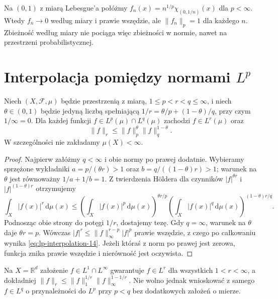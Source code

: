 \begin{przyklad}
Na $(0,1)$ z miarą Lebesgue'a połóżmy
$f_n(x)=n^{1/p}\chi_{(0,1/n)}(x)$ dla $p<\infty$.
Wtedy $f_n\to0$ według miary i prawie wszędzie,
ale $\|f_n\|_p=1$ dla każdego $n$.
Zbieżność według miary nie pociąga więc zbieżności
w normie, nawet na przestrzeni probabilistycznej.
\end{przyklad}

\section{Interpolacja pomiędzy normami $L^p$}

\begin{twierdzenie}
\label{thm:lp-interpolation-14}
Niech $(X,\mathcal F,\mu)$ będzie przestrzenią z miarą,
$1\le p<r<q\le\infty$, i niech $\theta\in(0,1)$
będzie jedyną liczbą spełniającą
$1/r=\theta/p+(1-\theta)/q$, przy czym $1/\infty=0$.
Dla każdej funkcji $f\in L^p(\mu)\cap L^q(\mu)$
zachodzi $f\in L^r(\mu)$ oraz
\begin{equation}\label{eq:lp-interpolation-14}
\|f\|_r\le\|f\|_p^{\theta}\|f\|_q^{1-\theta}.
\end{equation}
W szczególności nie zakładamy $\mu(X)<\infty$.
\end{twierdzenie}
\begin{proof}
Najpierw załóżmy $q<\infty$ i obie normy po prawej
dodatnie. Wybieramy sprzężone wykładniki
$a=p/(\theta r)>1$ oraz $b=q/((1-\theta)r)>1$;
warunek na $\theta$ jest równoważny $1/a+1/b=1$.
Z twierdzenia Höldera dla czynników
$|f|^{\theta r}$ i $|f|^{(1-\theta)r}$ otrzymujemy
\[
\int_X|f(x)|^r\,\mathrm d\mu(x)
\le\left(\int_X|f(x)|^p\,\mathrm d\mu(x)\right)^{\theta r/p}
\left(\int_X|f(x)|^q\,\mathrm d\mu(x)\right)^{(1-\theta)r/q}.
\]
Podnosząc obie strony do potęgi $1/r$, dostajemy tezę.
Gdy $q=\infty$, warunek na $\theta$ daje
$\theta r=p$. Wówczas
$|f|^r\le\|f\|_\infty^{r-p}|f|^p$
prawie wszędzie, z czego po całkowaniu wynika
\eqref{eq:lp-interpolation-14}. Jeżeli któraś
z norm po prawej jest zerowa, funkcja znika
prawie wszędzie i nierówność jest oczywista.
\end{proof}

\begin{przyklad}
Na $X=\mathbb R^d$ założenie $f\in L^1\cap L^\infty$
gwarantuje $f\in L^r$ dla wszystkich $1<r<\infty$,
a dokładniej $\|f\|_r\le\|f\|_1^{1/r}
\|f\|_\infty^{1-1/r}$. Nie wolno jednak wnioskować
z samego $f\in L^q$ o przynależności do $L^p$
przy $p<q$ bez dodatkowych założeń o mierze.
\end{przyklad}

